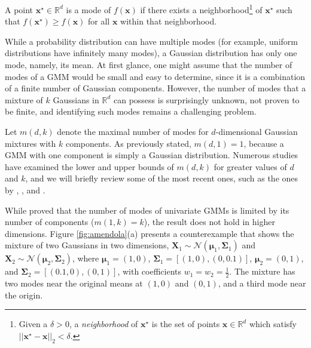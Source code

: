 \begin{definition}[Mode]
  A point $\mathbf{x}^\star \in \mathbb{R}^d$ is a mode of $f(\mathbf{x})$ if there exists a neighborhood\footnote{Given a $\delta > 0$, a \emph{neighborhood} of $\mathbf{x}^\star$ is the set of points $\mathbf{x} \in \mathbb{R}^d$ which satisfy $||\mathbf{x}^\star - \mathbf{x}||_2 < \delta$.} of $\mathbf{x}^\star$ such that $f(\mathbf{x}^\star) \geq f(\mathbf{x})$ for all $\mathbf{x}$ within that neighborhood.
\end{definition}

While a probability distribution can have multiple modes (for example, uniform distributions have infinitely many modes), a Gaussian distribution has only one mode, namely, its mean. At first glance, one might assume that the number of modes of a GMM would be small and easy to determine, since it is a combination of a finite number of Gaussian components. However, the number of modes that a mixture of $k$ Gaussians in $\mathbb{R}^d$ can possess is surprisingly unknown, not proven to be finite, and identifying such modes remains a challenging problem.

Let $m(d, k)$ denote the maximal number of modes for $d$-dimensional Gaussian mixtures with $k$ components. As previously stated, $m(d, 1) = 1$, because a GMM with one component is simply a Gaussian distribution. Numerous studies have examined the lower and upper bounds of $m(d, k)$ for greater values of $d$ and $k$, and we will briefly review some of the most recent ones, such as the ones by \citet{Carreira-Perpinan2003a}, \citet{Ray2012}, and \citet{Amendola2019}.

While \citet{Carreira-Perpinan2003} proved that the number of modes of univariate GMMs is limited by its number of components ($m(1, k) = k$), the result does not hold in higher dimensions. Figure \ref{fig:amendola}(a) presents a counterexample that shows the mixture of two Gaussians in two dimensions, $\mathbf{X}_1 \sim \mathcal{N}\left(\boldsymbol{\mu}_1, \boldsymbol{\Sigma}_1\right)$ and $\mathbf{X}_2 \sim \mathcal{N}\left(\boldsymbol{\mu}_2, \boldsymbol{\Sigma}_2\right)$, where $\boldsymbol{\mu}_1 = (1, 0)$, $\boldsymbol{\Sigma}_1 = [(1, 0), (0, 0.1)]$, $\boldsymbol{\mu}_2 = (0, 1)$, and $\boldsymbol{\Sigma}_2 = [(0.1, 0), (0, 1)]$, with coefficients $w_1 = w_2 = \frac{1}{2}$. The mixture has two modes near the original means at $(1, 0)$ and $(0, 1)$, and a third mode near the origin.

